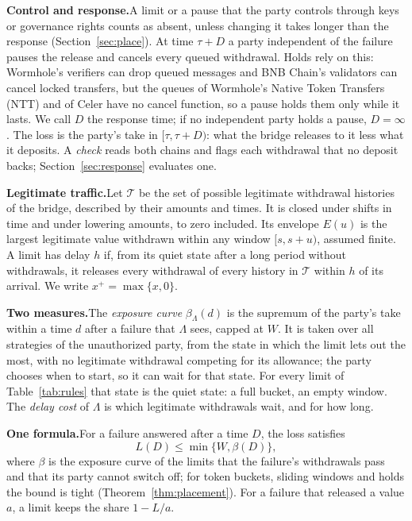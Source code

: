 \documentclass[conference,compsoc]{IEEEtran}
\numberwithin{equation}{section}
\theoremstyle{plain}
\theoremstyle{definition}
\theoremstyle{remark}
\newcommand{\runin}[1]{\par\smallskip\noindent\textbf{#1.}\enspace}
\newcommand{\Tset}{\mathcal{T}}
\begin{document}
\runin{Control and response}A limit or a pause that the party controls through keys or governance rights counts as absent, unless changing it takes longer than the response (Section~\ref{sec:place}). At time $\tau + D$ a party independent of the failure pauses the release and cancels every queued withdrawal. Holds rely on this: Wormhole's verifiers can drop queued messages and BNB Chain's validators can cancel locked transfers, but the queues of Wormhole's Native Token Transfers (NTT) and of Celer have no cancel function, so a pause holds them only while it lasts. We call $D$ the response time; if no independent party holds a pause, $D = \infty$. The loss is the party's take in $[\tau, \tau + D)$: what the bridge releases to it less what it deposits. A \emph{check} reads both chains and flags each withdrawal that no deposit backs; Section~\ref{sec:response} evaluates one.

\runin{Legitimate traffic}Let $\Tset$ be the set of possible legitimate withdrawal histories of the bridge, described by their amounts and times. It is closed under shifts in time and under lowering amounts, to zero included. Its envelope $E(u)$ is the largest legitimate value withdrawn within any window $[s, s + u)$, assumed finite. A limit has delay $h$ if, from its quiet state after a long period without withdrawals, it releases every withdrawal of every history in $\Tset$ within $h$ of its arrival. We write $x^+ = \max\{x, 0\}$.

\runin{Two measures}The \emph{exposure curve} $\beta_\Lambda(d)$ is the supremum of the party's take within a time $d$ after a failure that $\Lambda$ sees, capped at $W$. It is taken over all strategies of the unauthorized party, from the state in which the limit lets out the most, with no legitimate withdrawal competing for its allowance; the party chooses when to start, so it can wait for that state. For every limit of Table~\ref{tab:rules} that state is the quiet state: a full bucket, an empty window. The \emph{delay cost} of $\Lambda$ is which legitimate withdrawals wait, and for how long.

\runin{One formula}For a failure answered after a time $D$, the loss satisfies
\begin{equation}\label{eq:loss}
L(D) \le \min\{W, \beta(D)\},
\end{equation}
where $\beta$ is the exposure curve of the limits that the failure's withdrawals pass and that its party cannot switch off; for token buckets, sliding windows and holds the bound is tight (Theorem~\ref{thm:placement}). For a failure that released a value $a$, a limit keeps the share $1 - L/a$.
\end{document}
